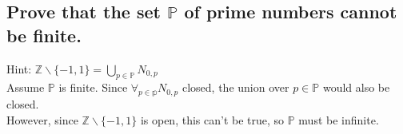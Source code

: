 \documentclass[]{article}
\newcommand{\Z}{\mathbb{Z}}
\begin{document}
\subsection{Prove that the set $\mathbb{P}$ of prime numbers cannot be finite.}
Hint: $\Z \backslash \{-1,1\} = \bigcup_{p \in \mathbb{P}} N_{0,p}$\\

Assume $\mathbb{P}$ is finite. 
Since $\forall_{p\in \mathbb{p}} N_{0,p}$ closed, the union over $p \in \mathbb{P}$ would also be closed.\\

However, since $\Z\backslash \{-1,1\}$ is open, this can't be true, so $\mathbb{P}$ must be infinite.
\end{document}
